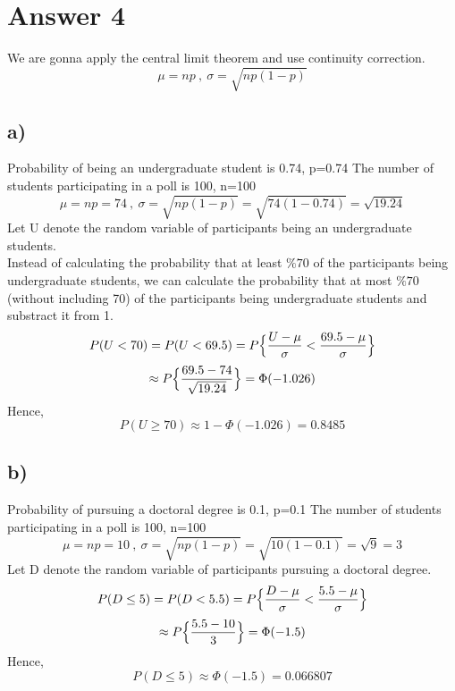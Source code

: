 \documentclass[12pt]{article}
\begin{document}
\section*{Answer 4}
We are gonna apply the central limit theorem and use continuity correction. 
\[\mu=np \ , \ \sigma=\sqrt{np(1-p)}\]
\subsection*{a)}
Probability of being an undergraduate student is 0.74, p=0.74
The number of students participating in a poll is 100, n=100
\[\mu=np=74 \ , \ \sigma=\sqrt{np(1-p)}=\sqrt{74(1-0.74)}=\sqrt{19.24}\]
Let U denote the random variable of participants being an undergraduate students. \\
Instead of calculating the probability that at least $\%70$ of the participants being undergraduate students, we can calculate the probability that at most $\%70$ (without including 70) of the participants being undergraduate students and substract it from 1. 
\[P(U < 70)=P(U<69.5)=P \Big{\{}\frac{U-\mu}{\sigma}<\frac{69.5-\mu}{\sigma}\Big{\}}\]
\[\approx P \Big{\{}\frac{69.5-74}{\sqrt{19.24}}\Big{\}}=\Phi(-1.026)\]
Hence, 
\[P(U \geq 70) \approx 1-\Phi(-1.026)=0.8485\]
\subsection*{b)}
Probability of pursuing a doctoral degree is 0.1, p=0.1
The number of students participating in a poll is 100, n=100
\[\mu=np=10 \ , \ \sigma=\sqrt{np(1-p)}=\sqrt{10(1-0.1)}=\sqrt{9}=3\]
Let D denote the random variable of participants pursuing a doctoral degree.
\[P(D \leq 5)=P(D < 5.5)=P \Big{\{}\frac{D-\mu}{\sigma}<\frac{5.5-\mu}{\sigma}\Big{\}}\]
\[\approx P \Big{\{}\frac{5.5-10}{3}\Big{\}}=\Phi(-1.5)\]
Hence,
\[P(D \leq 5) \approx \Phi(-1.5)=0.066807\]
\end{document}
